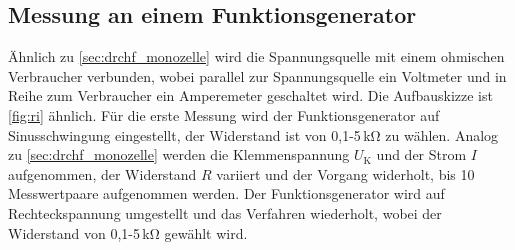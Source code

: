 \subsection{Messung an einem Funktionsgenerator}
\label{sec:drchf_funktion}
Ähnlich zu \ref{sec:drchf_monozelle} wird die Spannungsquelle mit einem ohmischen Verbraucher verbunden, wobei parallel zur Spannungsquelle ein Voltmeter und in Reihe zum Verbraucher ein Amperemeter geschaltet wird.
Die Aufbauskizze ist \ref{fig:ri} ähnlich.
Für die erste Messung wird der Funktionsgenerator auf Sinusschwingung eingestellt, der Widerstand ist von 0,1-5\,\si{\kilo\ohm} zu wählen.
Analog zu \ref{sec:drchf_monozelle} werden die Klemmenspannung  $U_\text{K}$ und der Strom $I$ aufgenommen, der Widerstand $R$ variiert und der Vorgang widerholt, bis 10 Messwertpaare aufgenommen werden.
Der Funktionsgenerator wird auf Rechteckspannung umgestellt und das Verfahren wiederholt, wobei
der Widerstand von 0,1-5\,\si{\kilo\ohm} gewählt wird.